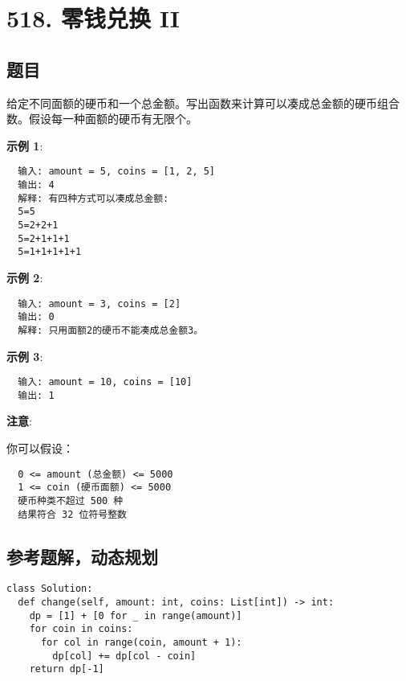 \newpage
\section{518. 零钱兑换 II}
\label{leetcode:518}

\subsection{题目}

给定不同面额的硬币和一个总金额。写出函数来计算可以凑成总金额的硬币组合数。假设每一种面额的硬币有无限个。 

\textbf{示例 1}:

\begin{verbatim}
  输入: amount = 5, coins = [1, 2, 5]
  输出: 4
  解释: 有四种方式可以凑成总金额:
  5=5
  5=2+2+1
  5=2+1+1+1
  5=1+1+1+1+1
\end{verbatim}

\textbf{示例 2}:

\begin{verbatim}
  输入: amount = 3, coins = [2]
  输出: 0
  解释: 只用面额2的硬币不能凑成总金额3。
\end{verbatim}

\textbf{示例 3}:

\begin{verbatim}
  输入: amount = 10, coins = [10]
  输出: 1
\end{verbatim}

\textbf{注意}:

你可以假设：

\begin{verbatim}
  0 <= amount (总金额) <= 5000
  1 <= coin (硬币面额) <= 5000
  硬币种类不超过 500 种
  结果符合 32 位符号整数
\end{verbatim}

\subsection{参考题解，动态规划}

\begin{verbatim}
class Solution:
  def change(self, amount: int, coins: List[int]) -> int:
    dp = [1] + [0 for _ in range(amount)]
    for coin in coins:
      for col in range(coin, amount + 1):
        dp[col] += dp[col - coin]
    return dp[-1]
\end{verbatim}
